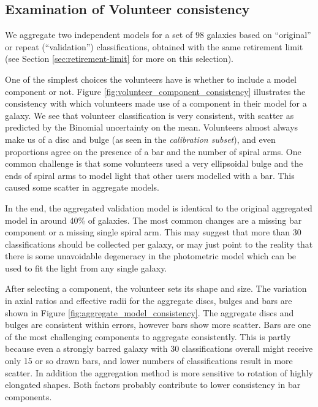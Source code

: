 \documentclass[../main.tex]{subfiles}
\begin{document}
\subsection{Examination of Volunteer consistency}
We aggregate two independent models for a set of 98 galaxies based on ``original'' or repeat (``validation'') classifications, obtained with the same retirement limit (see Section \ref{sec:retirement-limit} for more on this selection).

One of the simplest choices the volunteers have is whether to include a model component or not. Figure \ref{fig:volunteer_component_consistency} illustrates the consistency with which volunteers made use of a component in their model for a galaxy. We see that volunteer classification is very consistent, with scatter as predicted by the Binomial uncertainty on the mean. Volunteers almost always make us of a disc and bulge (as seen in the \textit{calibration subset}), and even proportions agree on the presence of a bar and the number of spiral arms. One common challenge is that some volunteers used a very ellipsoidal bulge and the ends of spiral arms to model light that other users modelled with a bar. This caused some scatter in aggregate models.

In the end, the aggregated validation model is identical to the original aggregated model in around 40\% of galaxies. The most common changes are a missing bar component or a missing single spiral arm. This may suggest that more than 30 classifications should be collected per galaxy, or may just point to the reality that there is some unavoidable degeneracy in the photometric model which can be used to fit the light from any single galaxy.

\begin{figure*}
  \caption{Comparison of frequency of use of component in volunteer models between the original and validation sets of classifications. Errors shown on the disc, bulge and bar arise from Binomial error estimation.}
  \label{fig:volunteer_component_consistency}
\end{figure*}

After selecting a component, the volunteer sets its shape and size. The variation in axial ratios and effective radii for the aggregate discs, bulges and bars are shown in Figure \ref{fig:aggregate_model_consistency}. The aggregate discs and bulges are consistent within errors, however bars show more scatter. Bars are one of the most challenging components to aggregate consistently. This is partly because even a strongly barred galaxy with 30 classifications overall might receive only 15 or so drawn bars, and lower numbers of classifications result in more scatter. In addition the aggregation method is more sensitive to rotation of highly elongated shapes. Both factors probably contribute to lower consistency in bar components.
\end{document}
